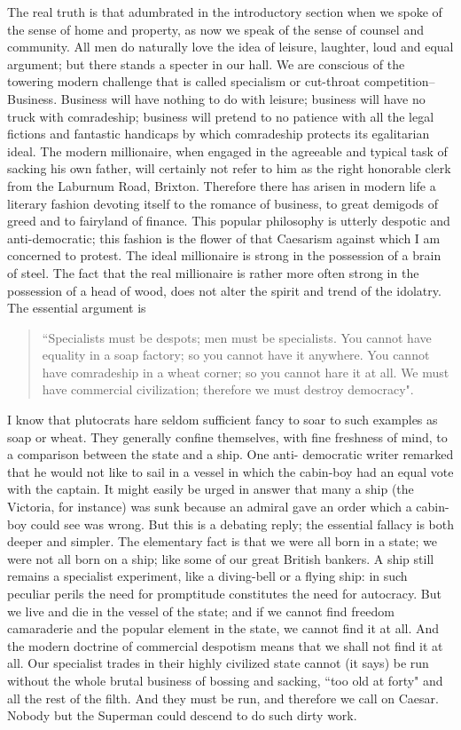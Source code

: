 \documentclass[final,10pt,letterpaper,twocolumn,openany]{book}
\begin{document}
The real truth is that adumbrated in the introductory section when we
spoke of the sense of home and property, as now we speak of the sense of
counsel and community. All men do naturally love the idea of leisure,
laughter, loud and equal argument; but there stands a specter in our hall.
We are conscious of the towering modern challenge that is called
specialism or cut-throat competition--Business. Business will have nothing
to do with leisure; business will have no truck with comradeship; business
will pretend to no patience with all the legal fictions and fantastic
handicaps by which comradeship protects its egalitarian ideal. The modern
millionaire, when engaged in the agreeable and typical task of sacking his
own father, will certainly not refer to him as the right honorable clerk from
the Laburnum Road, Brixton. Therefore there has arisen in modern life a
literary fashion devoting itself to the romance of business, to great
demigods of greed and to fairyland of finance. This popular philosophy is
utterly despotic and anti-democratic; this fashion is the flower of that
Caesarism against which I am concerned to protest. The ideal millionaire
is strong in the possession of a brain of steel. The fact that the real
millionaire is rather more often strong in the possession of a head of wood,
does not alter the spirit and trend of the idolatry. The essential argument is
\begin{quotation}\noindent
	``Specialists must be despots; men must be specialists. You cannot have
	equality in a soap factory; so you cannot have it anywhere. You cannot
	have comradeship in a wheat corner; so you cannot hare it at all. We must
	have commercial civilization; therefore we must destroy democracy".
\end{quotation}
I
know that plutocrats hare seldom sufficient fancy to soar to such examples
as soap or wheat. They generally confine themselves, with fine freshness
of mind, to a comparison between the state and a ship. One anti-
democratic writer remarked that he would not like to sail in a vessel in
which the cabin-boy had an equal vote with the captain. It might easily be
urged in answer that many a ship (the Victoria, for instance) was sunk
because an admiral gave an order which a cabin-boy could see was wrong.
But this is a debating reply; the essential fallacy is both deeper and simpler.
The elementary fact is that we were all born in a state; we were not all
born on a ship; like some of our great British bankers. A ship still remains
a specialist experiment, like a diving-bell or a flying ship: in such peculiar
perils the need for promptitude constitutes the need for autocracy. But we
live and die in the vessel of the state; and if we cannot find freedom
camaraderie and the popular element in the state, we cannot find it at all.
And the modern doctrine of commercial despotism means that we shall
not find it at all. Our specialist trades in their highly civilized state cannot
(it says) be run without the whole brutal business of bossing and sacking,
``too old at forty" and all the rest of the filth. And they must be run, and
therefore we call on Caesar. Nobody but the Superman could descend to
do such dirty work.
\end{document}
